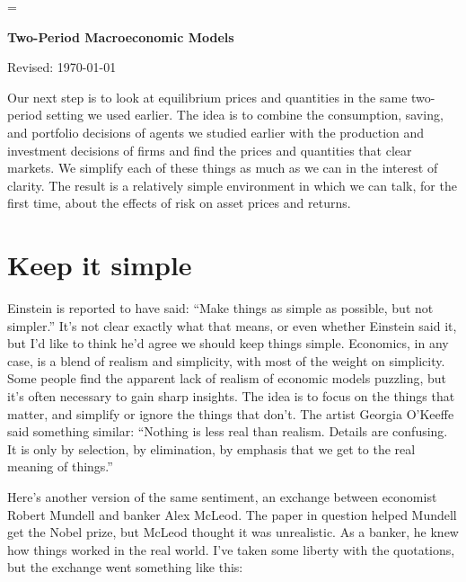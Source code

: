 \documentclass[11pt]{article}
\begin{document}
\parskip=\bigskipamount
\parindent=0.0in
\thispagestyle{empty}


\bigskip\bigskip
\centerline{\Large \bf Two-Period Macroeconomic Models}
\centerline{Revised: \today}

\bigskip
Our next step is to look at equilibrium prices and quantities
in the same two-period setting we used earlier.
The idea is to combine the consumption,
saving, and portfolio decisions of agents we studied earlier
with the production and investment decisions of firms
and find the prices and quantities that clear markets.
We simplify each of these things as much as we can
in the interest of clarity.
The result is a relatively simple environment in which
we can talk, for the first time, about the effects
of risk on asset prices and returns.



\section{Keep it simple}

Einstein is reported to have said:
``Make things as simple as possible, but not simpler.''
It's not clear exactly what that means, or even whether Einstein said it,
but I'd like to think he'd agree we should keep things simple.
Economics, in any case, is a blend of realism and simplicity,
with most of the weight on simplicity.
Some people find the apparent lack of realism of economic models puzzling,
but it's often necessary to gain sharp insights.
The idea is to focus on the things that matter,
and simplify or ignore the things that don't.
The artist Georgia O'Keeffe said something similar:
``Nothing is less real than realism. Details are confusing. It is only by
selection, by elimination, by emphasis that we get to the real meaning of
things.''

Here's another version of the same sentiment,
an exchange between economist Robert Mundell and banker Alex McLeod.
The paper in question helped Mundell get the Nobel prize,
but McLeod thought it was unrealistic.
As a banker, he knew how things worked in the real world.
I've taken some liberty with the quotations, but the exchange went something like this:
\end{document}
